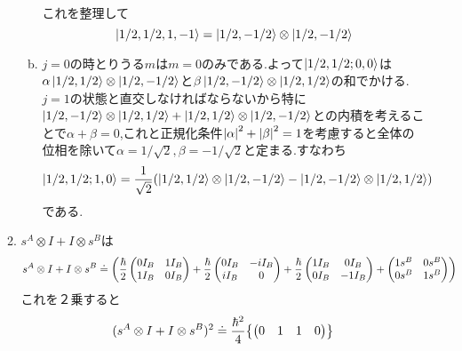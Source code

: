 \documentclass[uplatex,dvipdfmx, a4paper,11pt]{jsarticle}
\begin{document}
\begin{enumerate}[1.]
\begin{enumerate}[1）]
\begin{enumerate}[(a)]
\begin{align*}
                \end{align*}
                これを整理して
                \begin{equation}
                    \ket{1/2,1/2,1,-1}=\ket{1/2,-1/2}\otimes\ket{1/2,-1/2}
                \end{equation}
            \item $j=0$の時とりうる$m$は$m=0$のみである.よって$\ket{1/2,1/2;0,0}$は$\alpha\ket{1/2,1/2}\otimes\ket{1/2,-1/2}$と$\beta\ket{1/2,-1/2}\otimes\ket{1/2,1/2}$の和でかける. $j=1$の状態と直交しなければならないから特に$\ket{1/2,-1/2}\otimes\ket{1/2,1/2}+\ket{1/2,1/2}\otimes\ket{1/2,-1/2}$との内積を考えることで$\alpha+\beta=0$,これと正規化条件$\abs{\alpha}^2+\abs{\beta}^2=1$を考慮すると全体の位相を除いて$\alpha=1/\sqrt{2}, \beta=-1/\sqrt{2}$と定まる.すなわち
            \begin{equation}
                \ket{1/2,1/2;1,0}=\frac{1}{\sqrt{2}}\qty(\ket{1/2,1/2}\otimes\ket{1/2,-1/2}-\ket{1/2,-1/2}\otimes\ket{1/2,1/2})
            \end{equation}
            である.
        \end{enumerate}
        \item $s^A\otimes I+I\otimes s^B$は
        \begin{align*}
            s^A\otimes I+I\otimes s^B&\doteq \qty(\frac{\hbar}{2}\begin{pmatrix}
                0I_B&1I_B\\
                1I_B&0I_B
            \end{pmatrix}+\frac{\hbar}{2}
            \begin{pmatrix}
                    0I_B&-iI_B\\
                    iI_B&0
            \end{pmatrix}
                +\frac{\hbar}{2}\begin{pmatrix}
                1I_B&0I_B\\
                0I_B&-1I_B
            \end{pmatrix}+\begin{pmatrix}
                1s^B&0s^B\\
                0s^B&1s^B
            \end{pmatrix})
        \end{align*}
        これを２乗すると
        \begin{align*}
            (s^A\otimes I+I\otimes s^B)^2\doteq\frac{\hbar^2}{4}\qty{\begin{pmatrix}
                0&1&1&0\\

\end{pmatrix}}
\end{align*}
\end{enumerate}
\end{enumerate}
\end{document}
